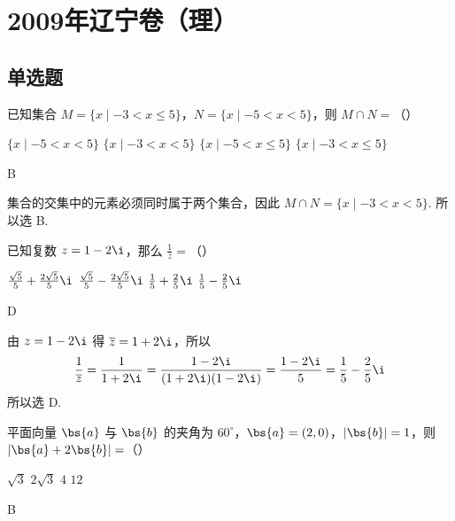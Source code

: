 \chapter{2009年辽宁卷（理）}
\section{单选题}

\begin{problem}
已知集合 \(M = \{x \mid -3 < x \leqslant 5\}\)，\(N = \{x \mid -5 < x < 5\}\)，则 \(M \cap N =\)（\quad）

\choices
    {\(\{x\mid -5 < x < 5\}\)}
    {\(\{x\mid -3 < x < 5\}\)}
    {\(\{x\mid -5 < x \leqslant 5\}\)}
    {\(\{x\mid -3 < x \leqslant 5\}\)}
\end{problem}

\begin{answer}
B
\end{answer}

\begin{solution}
集合的交集中的元素必须同时属于两个集合，因此
\(M\cap N=\{x\mid -3<x<5\}\).
所以选 B.
\end{solution}

\begin{problem}
已知复数 \(z = 1 - 2\i\)，那么 \(\frac{1}{\overline{z}} =\)（\quad）

\choices
    {\(\frac{\sqrt{5}}{5} + \frac{2\sqrt{5}}{5}\i\)}
    {\(\frac{\sqrt{5}}{5} -\frac{2\sqrt{5}}{5}\i\)}
    {\(\frac{1}{5} + \frac{2}{5}\i\)}
    {\(\frac{1}{5} -\frac{2}{5}\i\)}
\end{problem}

\begin{answer}
D
\end{answer}

\begin{solution}
由 \(z=1-2\i\) 得 \(\overline{z}=1+2\i\)，所以
\[
\frac{1}{\overline{z}}=\frac{1}{1+2\i}=\frac{1-2\i}{(1+2\i)(1-2\i)}=\frac{1-2\i}{5}=\frac{1}{5}-\frac{2}{5}\i
\]
所以选 D.
\end{solution}

\begin{problem}
平面向量 \(\bs{a}\) 与 \(\bs{b}\) 的夹角为 \(60^{\circ}\)，\(\bs{a} = (2,0)\)，\(|\bs{b}| = 1\)，则 \(|\bs{a} + 2\bs{b}| =\)（\quad）

\choices
    {\(\sqrt{3}\)}
    {\(2\sqrt{3}\)}
    {\(4\)}
    {\(12\)}
\end{problem}

\begin{answer}
B
\end{answer}

